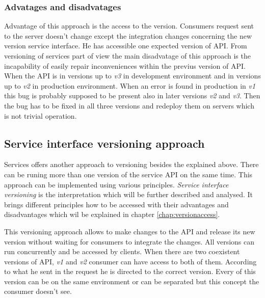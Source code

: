 \subsubsection{Advatages and disadvatages}
Advantage of this approach is the access to the version. Consumers request sent to the server doesn't change except the integration changes concerning the new version service interface. He has accessible one expected version of API.
From versioning of services part of view the main disadvatage of this approach is the incapability of easily repair inconveniences within the previus version of API. When the API is in versions up to \emph{v3} in development environment and in versions up to \emph{v2} in production environment. When an error is found in production in \emph{v1} this bug is probably supposed to be present also in later versions \emph{v2} and \emph{v3}. Then the bug has to be fixed in all three versions and redeploy them on servers which is not trivial operation.

\bigskip


\subsection{Service interface versioning approach}

Services offers another approach to versioning besides the explained above. There can be runing more than one version of the service API on the same time. This approach can be implemented using various principles. \emph{Service interface versioning} is the interpretation which will be further described and analysed. It brings different principles how to be accessed with their advantages and disadvantages which wil be explained in chapter \ref{chap:versionaccess}.

This versioning approach allows to make changes to the API and release its new version without waiting for consumers to integrate the changes. All versions can run concurrently and be accessed by clients. When there are two coexistent versions of API, \emph{v1} and \emph{v2} consumer can have access to both of them. According to what he sent in the request he is directed to the correct version. Every of this version can be on the same environment or can be separated but this concept the consumer doesn't see.



